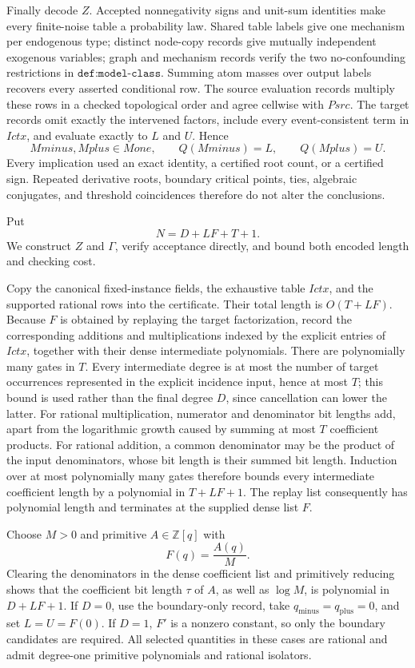 Finally decode \(Z\).  Accepted nonnegativity signs and unit-sum identities make every finite-noise table a probability law.  Shared table labels give one mechanism per endogenous type; distinct node-copy records give mutually independent exogenous variables; graph and mechanism records verify the two no-confounding restrictions in \(\texttt{def:model-class}\).  Summing atom masses over output labels recovers every asserted conditional row.  The source evaluation records multiply these rows in a checked topological order and agree cellwise with \(Psrc\).  The target records omit exactly the intervened factors, include every event-consistent term in \(Ictx\), and evaluate exactly to \(L\) and \(U\).  Hence
\[
 Mminus,Mplus\in Mone,
 \qquad Q(Mminus)=L,
 \qquad Q(Mplus)=U.
\]
Every implication used an exact identity, a certified root count, or a certified sign.  Repeated derivative roots, boundary critical points, ties, algebraic conjugates, and threshold coincidences therefore do not alter the conclusions.

Put
\[
 N=D+LF+T+1.
\]
We construct \(Z\) and \(\Gamma\), verify acceptance directly, and bound both encoded length and checking cost.

Copy the canonical fixed-instance fields, the exhaustive table \(Ictx\), and the supported rational rows into the certificate.  Their total length is \(O(T+LF)\).  Because \(F\) is obtained by replaying the target factorization, record the corresponding additions and multiplications indexed by the explicit entries of \(Ictx\), together with their dense intermediate polynomials.  There are polynomially many gates in \(T\).  Every intermediate degree is at most the number of target occurrences represented in the explicit incidence input, hence at most \(T\); this bound is used rather than the final degree \(D\), since cancellation can lower the latter.  For rational multiplication, numerator and denominator bit lengths add, apart from the logarithmic growth caused by summing at most \(T\) coefficient products.  For rational addition, a common denominator may be the product of the input denominators, whose bit length is their summed bit length.  Induction over at most polynomially many gates therefore bounds every intermediate coefficient length by a polynomial in \(T+LF+1\).  The replay list consequently has polynomial length and terminates at the supplied dense list \(F\).

Choose \(M>0\) and primitive \(A\in\mathbb Z[q]\) with
\[
 F(q)=\frac{A(q)}{M}.
\]
Clearing the denominators in the dense coefficient list and primitively reducing shows that the coefficient bit length \(\tau\) of \(A\), as well as \(\log M\), is polynomial in \(D+LF+1\).  If \(D=0\), use the boundary-only record, take \(q_{\mathrm{minus}}=q_{\mathrm{plus}}=0\), and set \(L=U=F(0)\).  If \(D=1\), \(F'\) is a nonzero constant, so only the boundary candidates are required.  All selected quantities in these cases are rational and admit degree-one primitive polynomials and rational isolators.

